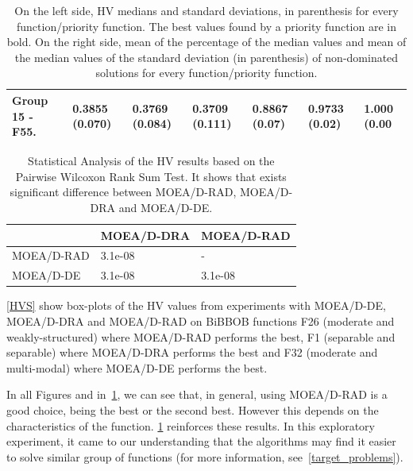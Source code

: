 \begin{center}
\begin{table}[!t]
\begin{tabular}{ccccccc}
		\multicolumn{1}{|l|}{Group 15 - F55.}  & \multicolumn{1}{l}{\textbf{0.3855 (0.070)}} & \multicolumn{1}{l}{0.3769 (0.084)} & \multicolumn{1}{l|}{0.3709 (0.111)}  		& \multicolumn{1}{l}{0.8867 (0.07)} & \multicolumn{1}{l}{0.9733 (0.02)} & \multicolumn{1}{l|}{1.000 (0.00} \\ \hline \hline \hline
	\end{tabular}
	\caption{On the left side, HV medians and standard deviations, in parenthesis for every function/priority function. The best values found by a priority function are in bold. On the right side, mean of the percentage of the median values and mean of the median values of the standard deviation (in parenthesis) of non-dominated solutions for every function/priority function.}
	\label{stats}
\end{table}
\end{center}

\begin{table}[!t]
	\begin{tabular}{lll}
		\hline
		\rowcolor[gray]{.7} \multicolumn{1}{|l|}{\textbf{HV}}  & \multicolumn{1}{|l|}{MOEA/D-DRA} & \multicolumn{1}{l|}{MOEA/D-RAD} \\ \hline \hline \hline
		MOEA/D-RAD                      &  3.1e-08                      & -                                      \\
		\rowcolor[gray]{.95} MOEA/D-DE                      &  3.1e-08                   &  3.1e-08                 \\
	\end{tabular}
	\caption{Statistical Analysis of the HV results based on the Pairwise Wilcoxon Rank Sum Test. It shows that exists significant difference between MOEA/D-RAD, MOEA/D-DRA and MOEA/D-DE.}
	\label{statistics}
\end{table}



\ref{HVS} show box-plots of the HV values from experiments with MOEA/D-DE, MOEA/D-DRA and MOEA/D-RAD on BiBBOB functions F26 (moderate and weakly-structured)  where MOEA/D-RAD performs the best,  F1 (separable and separable) where MOEA/D-DRA performs the best and F32 (moderate and multi-modal) where MOEA/D-DE performs the best. 

In all Figures and in~\ref{stats}, we can see that, in general, using MOEA/D-RAD is a good choice, being the best or the second best. However this depends on the characteristics of the function. \ref{stats} reinforces these results. In this exploratory experiment, it came to our understanding that the algorithms may find it easier to solve similar group of functions (for more information, see~\ref{target_problems}).

